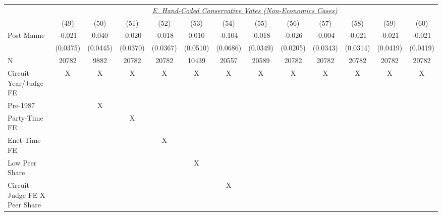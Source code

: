 \begin{center}
{\begin{tabular}{l*{12}{c}}
                    &\multicolumn{12}{c}{\uline{\textit{E. Hand-Coded Conservative Votes (Non-Economics Cases)}}}                                                                                       \\
                    &        (49)  &        (50)  &        (51)  &        (52)  &        (53)  &        (54)  &        (55)  &        (56)  &        (57)  &        (58)  &        (59)  &        (60)  \\
\cmidrule(lr){2-13}
Post Manne          &      -0.021  &       0.040  &      -0.020  &      -0.018  &       0.010  &      -0.104  &      -0.018  &      -0.026  &      -0.004  &      -0.021  &      -0.021  &      -0.021  \\
                    &    (0.0375)  &    (0.0445)  &    (0.0370)  &    (0.0367)  &    (0.0510)  &    (0.0686)  &    (0.0349)  &    (0.0205)  &    (0.0343)  &    (0.0314)  &    (0.0419)  &    (0.0419)  \\
\cmidrule(lr){1-13}
N                   &       20782  &        9882  &       20782  &       20782  &       10439  &       20557  &       20589  &       20782  &       20782  &       20782  &       20782  &       20782  \\
Circuit-Year/Judge FE&           X  &           X  &           X  &           X  &           X  &           X  &           X  &           X  &           X  &           X  &           X  &           X  \\
Pre-1987            &              &           X  &              &              &              &              &              &              &              &              &              &              \\
Party-Time FE       &              &              &           X  &              &              &              &              &              &              &              &              &              \\
Enet-Time FE        &              &              &              &           X  &              &              &              &              &              &              &              &              \\
Low Peer Share      &              &              &              &              &           X  &              &              &              &              &              &              &              \\
Circuit-Judge FE X Peer Share&              &              &              &              &              &           X  &              &              &              &              &              &              \\

\end{tabular}}
\end{center}

